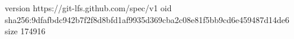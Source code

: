 version https://git-lfs.github.com/spec/v1
oid sha256:9dfafbdc942b7f2f8d8bfd1af9935d369cba2c08e81f5bb9cd6e459487d14de6
size 174916

